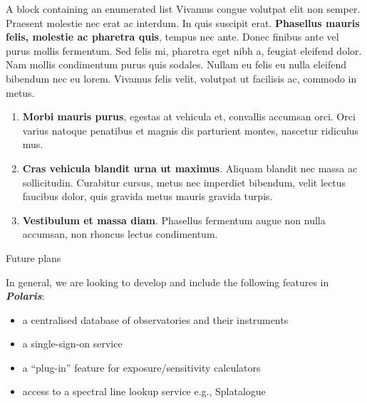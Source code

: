 \documentclass[final]{beamer}
\newlength{\colwidth}
\begin{document}
\begin{frame}[t]
\begin{columns}[t]
\begin{column}{\colwidth}
\begin{block}{A block containing an enumerated list}
                    Vivamus congue volutpat elit non semper. Praesent molestie nec erat ac
                    interdum. In quis suscipit erat. \textbf{Phasellus mauris felis, molestie
                    ac pharetra quis}, tempus nec ante. Donec finibus ante vel purus mollis
                    fermentum. Sed felis mi, pharetra eget nibh a, feugiat eleifend dolor. Nam
                    mollis condimentum purus quis sodales. Nullam eu felis eu nulla eleifend
                    bibendum nec eu lorem. Vivamus felis velit, volutpat ut facilisis ac,
                    commodo in metus.

                    \begin{enumerate}
                        \item \textbf{Morbi mauris purus}, egestas at vehicula et, convallis
                        accumsan orci. Orci varius natoque penatibus et magnis dis parturient
                        montes, nascetur ridiculus mus.
                        \item \textbf{Cras vehicula blandit urna ut maximus}. Aliquam blandit nec
                        massa ac sollicitudin. Curabitur cursus, metus nec imperdiet bibendum,
                        velit lectus faucibus dolor, quis gravida metus mauris gravida turpis.
                        \item \textbf{Vestibulum et massa diam}. Phasellus fermentum augue non
                        nulla accumsan, non rhoncus lectus condimentum.
                    \end{enumerate}

                \end{block}

                \begin{exampleblock}{Future plans}

                    In general, we are looking to develop and include the following features in
                    \textbf{\emph{Polaris}}:

                    \begin{itemize}
                        \item a centralised database of observatories and their instruments
                        \item a single-sign-on service
                        \item a ``plug-in'' feature for exposure/sensitivity calculators
                        \item access to a spectral line lookup service e.g., Splatalogue
                    \end{itemize}


\end{exampleblock}
\end{column}
\end{columns}
\end{frame}
\end{document}
